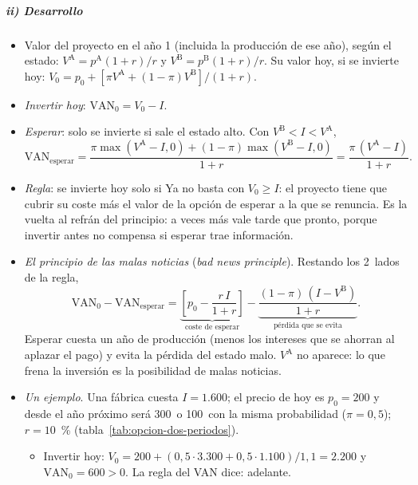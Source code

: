 \documentclass[11pt]{article}
\begin{document}
\subparagraph{ii) Desarrollo}

\begin{itemize}
\item Valor del proyecto en el año 1 (incluida la producción de ese año), según el estado: $V^{\mathrm A}=p^{\mathrm A}(1+r)/r$ y $V^{\mathrm B}=p^{\mathrm B}(1+r)/r$. Su valor hoy, si se invierte hoy: $V_0=p_0+\left[\pi V^{\mathrm A}+(1-\pi)V^{\mathrm B}\right]/(1+r)$.
\item \emph{Invertir hoy}: $\mathrm{VAN}_0=V_0-I$.
\item \emph{Esperar}: solo se invierte si sale el estado alto. Con $V^{\mathrm B}<I<V^{\mathrm A}$,
  \begin{equation*}
  \mathrm{VAN}_{\mathrm{esperar}}=\frac{\pi\max(V^{\mathrm A}-I,0)+(1-\pi)\max(V^{\mathrm B}-I,0)}{1+r}=\frac{\pi\,(V^{\mathrm A}-I)}{1+r}.
  \end{equation*}
\item \emph{Regla}: se invierte hoy solo si
  Ya no basta con $V_0\geq I$: el proyecto tiene que cubrir su coste más el valor de la opción de esperar a la que se renuncia. Es la vuelta al refrán del principio: a veces más vale tarde que pronto, porque invertir antes no compensa si esperar trae información.
\item \emph{El principio de las malas noticias} (\emph{bad news principle}). Restando los 2~lados de la regla,
  \begin{equation*}
  \mathrm{VAN}_0-\mathrm{VAN}_{\mathrm{esperar}}=\underbrace{\left[p_0-\frac{r\,I}{1+r}\right]}_{\text{coste de esperar}}-\underbrace{\frac{(1-\pi)\,(I-V^{\mathrm B})}{1+r}}_{\text{pérdida que se evita}}.
  \end{equation*}
  Esperar cuesta un año de producción (menos los intereses que se ahorran al aplazar el pago) y evita la pérdida del estado malo. $V^{\mathrm A}$ no aparece: lo que frena la inversión es la posibilidad de malas noticias\nocite{Bernanke1983Irreversibility}.
\item \emph{Un ejemplo}\nocite{Pindyck1991Irreversibility,DixitPindyck1994}. Una fábrica cuesta $I=1.600$; el precio de hoy es $p_0=200$ y desde el año próximo será 300~o 100~con la misma probabilidad ($\pi=0{,}5$); $r=10$~\% (tabla~\ref{tab:opcion-dos-periodos}).
  \begin{itemize}
  \item Invertir hoy: $V_0=200+(0{,}5\cdot 3.300+0{,}5\cdot 1.100)/1{,}1=2.200$ y $\mathrm{VAN}_0=600>0$. La regla del VAN dice: adelante.

\end{itemize}
\end{itemize}
\end{document}
